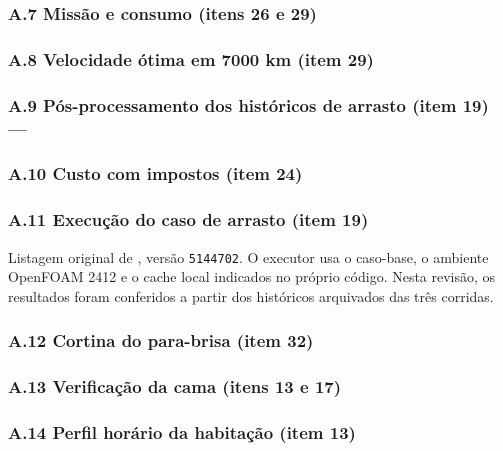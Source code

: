 \subsubsection*{A.7 Missão e consumo (itens 26 e 29)}
\noindent{}\par

\subsubsection*{A.8 Velocidade ótima em 7000 km (item 29)}
\noindent{}\par

\subsubsection*{A.9 Pós-processamento dos históricos de arrasto (item 19) — }

\subsubsection*{A.10 Custo com impostos (item 24)}
\noindent{}\par


\subsubsection*{A.11 Execução do caso de arrasto (item 19)}
Listagem original de , versão \texttt{5144702}. O executor usa o caso-base, o ambiente OpenFOAM 2412 e o cache local indicados no próprio código. Nesta revisão, os resultados foram conferidos a partir dos históricos arquivados das três corridas.

\subsubsection*{A.12 Cortina do para-brisa (item 32)}
\noindent{}\par


\subsubsection*{A.13 Verificação da cama (itens 13 e 17)}

\subsubsection*{A.14 Perfil horário da habitação (item 13)}

